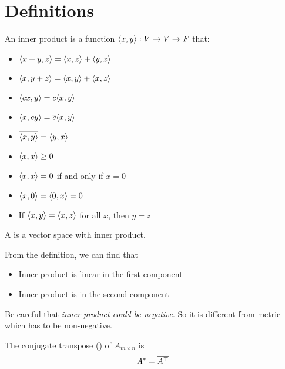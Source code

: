 \section{Definitions}

\begin{definition}
    An inner product is a function $\innerproduct{x}{y}: V \rightarrow V \rightarrow F$ that:
\begin{itemize}
    \item $\innerproduct{x + y}{z} = \innerproduct{x}{z} + \innerproduct{y}{z}$    
    \item $\innerproduct{x}{y+z} = \innerproduct{x}{y} + \innerproduct{x}{z}$
    \item $\innerproduct{cx}{y} = c \innerproduct{x}{y}$
    \item $\innerproduct{x}{cy} = \conjugate{c} \innerproduct{x}{y}$
    \item $\conjugate{\innerproduct{x}{y}} = \innerproduct{y}{x}$
    \item $\innerproduct{x}{x} \geq 0$
    \item $\innerproduct{x}{x} = 0$ if and only if $x = 0$
    \item $\innerproduct{x}{0} = \innerproduct{0}{x} = 0$
    \item If $\innerproduct{x}{y} = \innerproduct{x}{z}$ for all $x$, then $y = z$
\end{itemize}

A  is a vector space with inner product.
\end{definition}



From the definition, we can find that
\begin{itemize}
    \item Inner product is linear in the first component
    \item Inner product is  in the second component
\end{itemize}

Be careful that \emph{inner product could be negative}. So it is different from metric which has to be non-negative.


\begin{definition}
    The conjugate transpose () of $A_{m \times n}$ is 
    \begin{equation}
        A^* = \overline{{A}^\top}
    \end{equation}
\end{definition}

